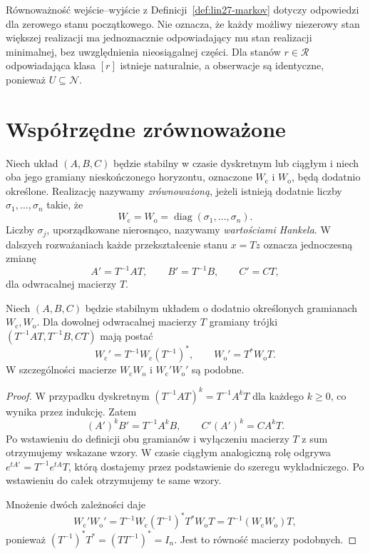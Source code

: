 \begin{uwaga}
\label{rem:lin27-zerostate}
Równoważność wejście--wyjście
z
Definicji~\ref{def:lin27-markov}
dotyczy odpowiedzi
dla zerowego stanu początkowego.
Nie oznacza, że
każdy możliwy niezerowy stan
większej realizacji
ma jednoznacznie
odpowiadający mu stan
realizacji minimalnej,
bez uwzględnienia
nieosiągalnej części.
Dla stanów \(r\in\mathcal R\)
odpowiadająca klasa \([r]\)
istnieje naturalnie,
a obserwacje są identyczne,
ponieważ \(U\subseteq\mathcal N\).
\end{uwaga}

\section{Współrzędne zrównoważone}
\label{sec:lin27-balanced}

\begin{definicja}
\label{def:lin27-balanced}
Niech układ
\((A,B,C)\) będzie stabilny
w czasie dyskretnym lub ciągłym
i niech oba jego gramiany
nieskończonego horyzontu,
oznaczone \(W_{\mathrm c}\)
i \(W_{\mathrm o}\),
będą dodatnio określone.
Realizację nazywamy
\emph{zrównoważoną}, jeżeli
istnieją dodatnie liczby
\(\sigma_1,\ldots,\sigma_n\)
takie, że
\[
 W_{\mathrm c}
 =W_{\mathrm o}
 =\operatorname{diag}
    (\sigma_1,\ldots,\sigma_n).
\]
Liczby \(\sigma_j\),
uporządkowane nierosnąco,
nazywamy
\emph{wartościami Hankela}.
W dalszych rozważaniach
każde przekształcenie
stanu \(x=Tz\)
oznacza jednoczesną zmianę
\[
 A'=T^{-1}AT,\qquad
 B'=T^{-1}B,\qquad
 C'=CT,
\]
dla odwracalnej macierzy \(T\).
\end{definicja}

\begin{lemat}
\label{lem:lin27-gramian-transform}
Niech \((A,B,C)\) będzie
stabilnym układem o dodatnio
określonych gramianach
\(W_{\mathrm c},W_{\mathrm o}\).
Dla dowolnej odwracalnej
macierzy \(T\)
gramiany trójki
\((T^{-1}AT,T^{-1}B,CT)\)
mają postać
\[
 W_{\mathrm c}'=
   T^{-1}W_{\mathrm c}(T^{-1})^*,
 \qquad
 W_{\mathrm o}'=T^*W_{\mathrm o}T.
\]
W szczególności
macierze
\(W_{\mathrm c}W_{\mathrm o}\)
i
\(W_{\mathrm c}'W_{\mathrm o}'\)
są podobne.
\end{lemat}
\begin{proof}
W przypadku dyskretnym
\((T^{-1}AT)^k=T^{-1}A^kT\)
dla każdego \(k\ge0\),
co wynika przez indukcję.
Zatem
\[
 (A')^kB'=T^{-1}A^kB,
 \qquad
 C'(A')^k=CA^kT.
\]
Po wstawieniu do definicji
obu gramianów i wyłączeniu
macierzy \(T\) z sum
otrzymujemy wskazane wzory.
W czasie ciągłym analogiczną
rolę odgrywa
\(e^{tA'}=T^{-1}e^{tA}T\),
którą dostajemy
przez podstawienie do
szeregu wykładniczego.
Po wstawieniu do całek
otrzymujemy te same wzory.

Mnożenie dwóch zależności
daje
\[
 W_{\mathrm c}'W_{\mathrm o}'
 =T^{-1}W_{\mathrm c}
    (T^{-1})^*T^*W_{\mathrm o}T
 =T^{-1}(W_{\mathrm c}W_{\mathrm o})T,
\]
ponieważ
\((T^{-1})^*T^*
 =(TT^{-1})^*=I_n\).
Jest to równość
macierzy podobnych.
\end{proof}

